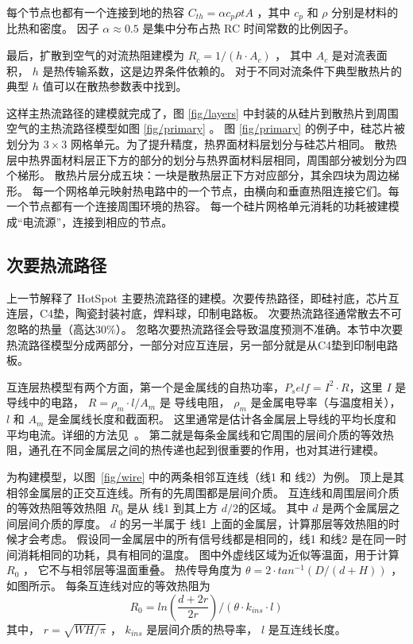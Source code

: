 每个节点也都有一个连接到地的热容 $C_{th} = \alpha c_p \rho t A$ ，其中 $c_p$ 和 $\rho$ 分别是材料的比热和密度。
因子  $\alpha \approx 0.5$ 是集中分布占热 RC 时间常数的比例因子。

最后，扩散到空气的对流热阻建模为 $R_c = 1/(h\cdot A_c)$ ， 其中 $A_c$ 是对流表面积， $h$ 是热传输系数，这是边界条件依赖的。
对于不同对流条件下典型散热片的典型 $h$ 值可以在散热参数表中找到。

这样主热流路径的建模就完成了，图 \ref{fig/layers} 中封装的从硅片到散热片到周围空气的主热流路径模型如图 \ref{fig/primary} 。 
图 \ref{fig/primary} 的例子中，硅芯片被划分为 $3 \times 3$ 网格单元。为了提升精度，热界面材料层划分与硅芯片相同。
散热层中热界面材料层正下方的部分的划分与热界面材料层相同，周围部分被划分为四个梯形。
散热片层分成五块：一块是散热层正下方对应部分，其余四块为周边梯形。
每一个网格单元映射热电路中的一个节点，由横向和垂直热阻连接它们。每一个节点都有一个连接周围环境的热容。
每一个硅片网格单元消耗的功耗被建模成“电流源”，连接到相应的节点。

\subsection{次要热流路径}\label{sec:secondary}

上一节解释了 HotSpot 主要热流路径的建模。次要传热路径，即硅衬底，芯片互连层，C4垫，陶瓷封装衬底，焊料球，印制电路板。
次要热流路径通常散去不可忽略的热量（高达$30\%$）。
忽略次要热流路径会导致温度预测不准确。本节中次要热流路径模型分成两部分，一部分对应互连层，另一部分就是从C4垫到印制电路板。

互连层热模型有两个方面，第一个是金属线的自热功率，$P_self = I^2\cdot R$，这里 $I$ 是导线中的电路，
$R = \rho_m \cdot l/A_m$ 是 导线电阻， $\rho_m$ 是金属电导率（与温度相关）， $l$ 和 $A_m$ 是金属线长度和截面积。
这里通常是估计各金属层上导线的平均长度和平均电流。详细的方法见~\cite{huang2004compact}。
第二就是每条金属线和它周围的层间介质的等效热阻，通孔在不同金属层之间的热传递也起到很重要的作用，也对其进行建模。

为构建模型，以图~\ref{fig/wire} 中的两条相邻互连线（线1 和 线2）为例。
顶上是其相邻金属层的正交互连线。所有的先周围都是层间介质。
互连线和周围层间介质的等效热阻等效热阻 $R_0$ 是从 线1 到其上方 $d/2$的区域。
其中 $d$ 是两个金属层之间层间介质的厚度。
$d$ 的另一半属于 线1 上面的金属层，计算那层等效热阻的时候才会考虑。
假设同一金属层中的所有信号线都是相同的，线1 和线2 是在同一时间消耗相同的功耗，具有相同的温度。
图中外虚线区域为近似等温面，用于计算 $R_0$ ， 它不与相邻层等温面重叠。
热传导角度为 $\theta = 2 \cdot tan^{-1}(D/(d+H))$ ，如图所示。
每条互连线对应的等效热阻为
\begin{equation}\label{eq:R0}
R_0 = ln(\frac{d+2r}{2r})/(\theta \cdot k_{ins} \cdot l)
\end{equation}
其中， $r = \sqrt{WH/\pi}$ ， $k_{ins}$ 是层间介质的热导率， $l$ 是互连线长度。

